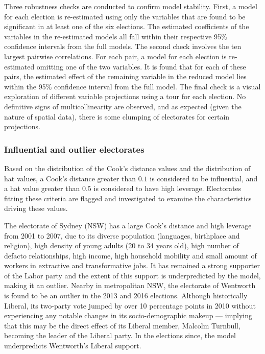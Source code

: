 \documentclass[times, doublespace]{anzsauth}
\begin{document}
Three robustness checks are conducted to confirm model stability. First, a model for each election is re-estimated using only the variables that are found to be significant in at least one of the six elections. The estimated coefficients of the variables in the re-estimated models all fall within their respective 95\% confidence intervals from the full models. The second check involves the ten largest pairwise correlations. For each pair, a model for each election is re-estimated omitting one of the two variables. It is found that for each of these pairs, the estimated effect of the remaining variable in the reduced model lies within the 95\% confidence interval from the full model. The final check is a visual exploration of different variable projections using a tour \citep{tourr} for each election. No definitive signs of multicollinearity are observed, and as expected (given the nature of spatial data), there is some clumping of electorates for certain projections.

\hypertarget{influential-and-outlier-electorates}{%
\subsubsection*{Influential and outlier electorates}\label{influential-and-outlier-electorates}}

Based on the distribution of the Cook's distance values and the distribution of hat values, a Cook's distance greater than \(0.1\) is considered to be influential, and a hat value greater than \(0.5\) is considered to have high leverage. Electorates fitting these criteria are flagged and investigated to examine the characteristics driving these values.

The electorate of Sydney (NSW) has a large Cook's distance and high leverage from 2001 to 2007, due to its diverse population (languages, birthplace and religion), high density of young adults (20 to 34 years old), high number of defacto relationships, high income, high household mobility and small amount of workers in extractive and transformative jobs. It has remained a strong supporter of the Labor party and the extent of this support is underpredicted by the model, making it an outlier. Nearby in metropolitan NSW, the electorate of Wentworth is found to be an outlier in the 2013 and 2016 elections. Although historically Liberal, its two-party vote jumped by over 10 percentage points in 2010 without experiencing any notable changes in its socio-demographic makeup --- implying that this may be the direct effect of its Liberal member, Malcolm Turnbull, becoming the leader of the Liberal party. In the elections since, the model underpredicts Wentworth's Liberal support.
\end{document}
